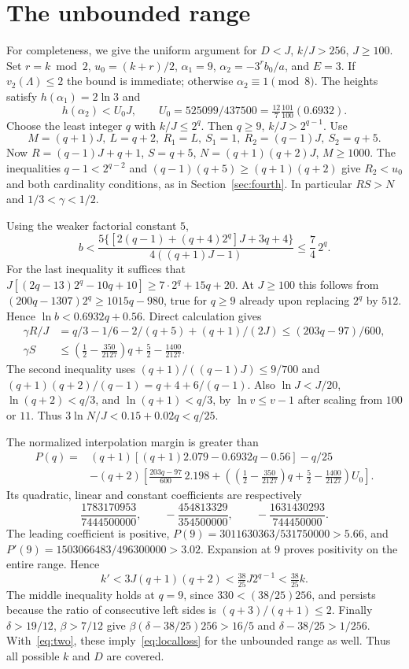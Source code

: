 \documentclass[11pt]{article}
\theoremstyle{definition}\newtheorem{definition}[theorem]{Definition}
\newcommand{\val}{v_2}
\begin{document}
\section{The unbounded range}\label{sec:unbounded}
For completeness, we give the uniform argument for $D<J$, $k/J>256$, $J\ge100$. Set $r=k\bmod2$, $u_0=(k+r)/2$, $\alpha_1=9$, $\alpha_2=-3^rb_0/a$, and $E=3$. If $\val(\Lambda)\le2$ the bound is immediate; otherwise $\alpha_2\equiv1\pmod8$. The heights satisfy $h(\alpha_1)=2\ln3$ and
\[
 h(\alpha_2)<U_0J,\qquad U_0=525099/437500
 =\tfrac{12}{7}\tfrac{101}{100}(0.6932).
\]
Choose the least integer $q$ with $k/J\le2^q$. Then $q\ge9$, $k/J>2^{q-1}$. Use
\[
 M=(q+1)J,\ L=q+2,\ R_1=L,\ S_1=1,\ R_2=(q-1)J,\ S_2=q+5.
\]
Now $R=(q-1)J+q+1$, $S=q+5$, $N=(q+1)(q+2)J$, $M\ge1000$. The inequalities $q-1<2^{q-2}$ and $(q-1)(q+5)\ge(q+1)(q+2)$ give $R_2<u_0$ and both cardinality conditions, as in Section~\ref{sec:fourth}. In particular $RS>N$ and $1/3<\gamma<1/2$.

Using the weaker factorial constant $5$,
\[
 b<\frac{5\{[2(q-1)+(q+4)2^q]J+3q+4\}}{4((q+1)J-1)}
 \le\frac74\,2^q.
\]
For the last inequality it suffices that
$J[(2q-13)2^q-10q+10]\ge7\cdot2^q+15q+20$.
At $J\ge100$ this follows from $(200q-1307)2^q\ge1015q-980$, true for $q\ge9$ already upon replacing $2^q$ by $512$. Hence $\ln b<0.6932q+0.56$. Direct calculation gives
\begin{align*}
 \gamma R/J&=q/3-1/6-2/(q+5)+(q+1)/(2J)
 \le(203q-97)/600,\\
 \gamma S&\le\left(\tfrac12-\tfrac{350}{2127}\right)q
                   +\tfrac52-\tfrac{1400}{2127}.
\end{align*}
The second inequality uses $(q+1)/((q-1)J)\le9/700$ and $(q+1)(q+2)/(q-1)=q+4+6/(q-1)$. Also $\ln J<J/20$, $\ln(q+2)<q/3$, and $\ln(q+1)<q/3$, by $\ln v\le v-1$ after scaling from $100$ or $11$. Thus $3\ln N/J<0.15+0.02q<q/25$.

The normalized interpolation margin is greater than
\begin{align*}
P(q)={}&(q+1)[(q+1)2.079-0.6932q-0.56]-q/25\\
&-(q+2)\left[\frac{203q-97}{600}\,2.198
 +\left(\left(\tfrac12-\tfrac{350}{2127}\right)q
       +\tfrac52-\tfrac{1400}{2127}\right)U_0\right].
\end{align*}
Its quadratic, linear and constant coefficients are respectively
\[
 \frac{1783170953}{7444500000},\qquad
 -\frac{454813329}{354500000},\qquad
 -\frac{1631430293}{744450000}.
\]
The leading coefficient is positive, $P(9)=3011630363/531750000>5.66$, and $P'(9)=1503066483/496300000>3.02$. Expansion at $9$ proves positivity on the entire range. Hence
\[
 k'<3J(q+1)(q+2)<\tfrac{38}{25}J2^{q-1}<\tfrac{38}{25}k.
\]
The middle inequality holds at $q=9$, since $330<(38/25)256$, and persists because the ratio of consecutive left sides is $(q+3)/(q+1)\le2$.
Finally $\delta>19/12$, $\beta>7/12$ give
$\beta(\delta-38/25)256>16/5$ and $\delta-38/25>1/256$. With~\eqref{eq:two}, these imply~\eqref{eq:localloss} for the unbounded range as well. Thus all possible $k$ and $D$ are covered.
\end{document}

